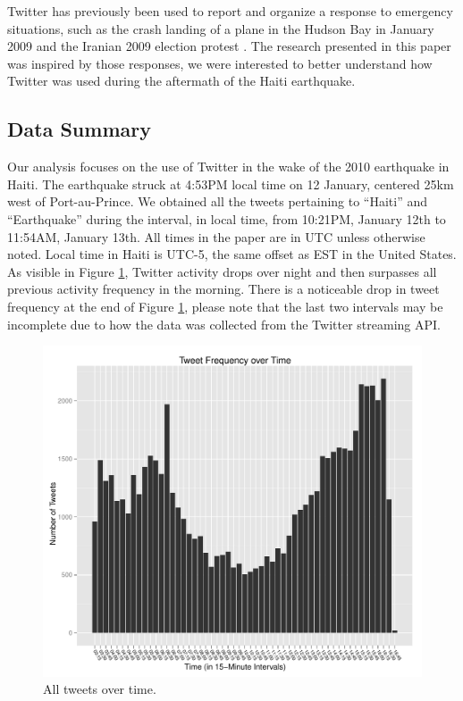 \documentclass[a4paper, 11pt, titlepage]{article}
\begin{document}
Twitter has previously been used to report and organize a response to emergency situations, such as the crash landing of a plane in the Hudson Bay in January 2009 \cite{Deards2009} and the Iranian 2009 election protest \cite{Grossman2009}.  The research presented in this paper was inspired by those responses, we were interested to better understand how Twitter was used during the aftermath of the Haiti earthquake.

\subsection{Data Summary}
Our analysis focuses on the use of Twitter in the wake of the 2010 earthquake in Haiti. The earthquake struck at 4:53PM local time on 12 January, centered 25km west of Port-au-Prince. We obtained all the tweets pertaining to ``Haiti'' and ``Earthquake'' during the interval, in local time, from 10:21PM, January 12th to 11:54AM, January 13th.  All times in the paper are in UTC unless otherwise noted.  Local time in Haiti is UTC-5, the same offset as EST in the United States.  As visible in Figure \ref{fig:all_tweets_over_time}, Twitter activity drops over night and then surpasses all previous activity frequency in the morning.  There is a noticeable drop in tweet frequency at the end of Figure \ref{fig:all_tweets_over_time}, please note that the last two intervals may be incomplete due to how the data was collected from the Twitter streaming API.

\begin{figure}[h]
\centering
\includegraphics[width=120mm]{../figures/all_tweets_over_time}
\caption{All tweets over time.}
\label{fig:all_tweets_over_time}
\end{figure}
\end{document}
